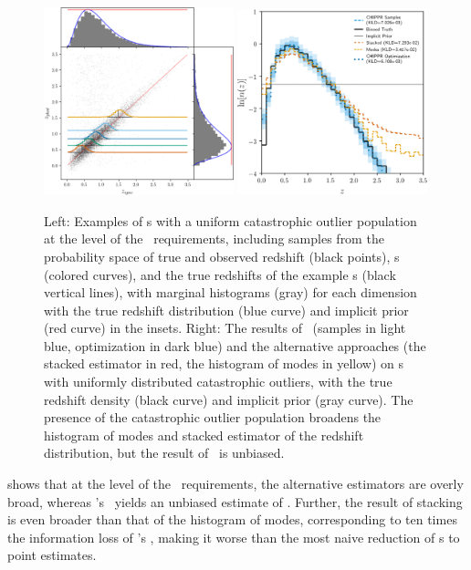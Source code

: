 \begin{figure}
	\includegraphics[width=0.49\textwidth]{figures/chippr/single_uout_mega_scatter.png}
	\includegraphics[width=0.49\textwidth]{figures/chippr/single_uout_log_estimators.png}
	\caption{
		Left: Examples of \pzpdf s with a uniform catastrophic outlier population at the level of the \lsst\ requirements, including samples from the probability space of true and observed redshift (black points), \pzpdf s (colored curves), and the true redshifts of the example \pzpdf s (black vertical lines), with marginal histograms (gray) for each dimension with the true redshift distribution (blue curve) and implicit prior (red curve) in the insets.
		Right: The results of \Chippr\ (samples in light blue, optimization in dark blue) and the alternative approaches (the stacked estimator in red, the histogram of modes in yellow) on \pzpdf s with uniformly distributed catastrophic outliers, with the true redshift density (black curve) and implicit prior (gray curve).
		The presence of the catastrophic outlier population broadens the histogram of modes and stacked estimator of the redshift distribution, but the result of \Chippr\ is unbiased.
	}
\end{figure}

 shows that at the level of the \lsst\ requirements, the alternative estimators are overly broad, whereas \Chippr's \mmle\ yields an unbiased estimate of \nz.
Further, the result of stacking is even broader than that of the histogram of modes, corresponding to ten times the information loss of \Chippr's \mmle, making it worse than the most naive reduction of \pzpdf s to point estimates.

